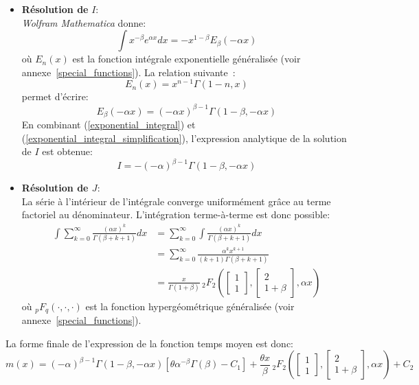 \begin{itemize}
    \item \textbf{Résolution de} $I$: \\
    \textit{Wolfram Mathematica} donne:
    \begin{equation}\label{exponential_integral}
        \int x^{-\beta}e^{\alpha x}dx = -x^{1-\beta}E_\beta(-\alpha x)
    \end{equation}
    où $E_n(x)$ est la fonction intégrale exponentielle généralisée (voir annexe~\ref{special_functions}).
    La relation suivante~\cite{abramowitz1964}:
    \[
    E_n(x)=x^{n-1}\Gamma(1-n,x)
    \]
    permet d'écrire: 
    \begin{equation}\label{exponential_integral_simplification}
        E_{\beta}(-\alpha x)={(-\alpha x)}^{\beta-1}\Gamma(1-\beta,-\alpha x)
    \end{equation}
    En combinant (\ref{exponential_integral}) et (\ref{exponential_integral_simplification}), l'expression analytique de la solution de $I$ est obtenue:
    \[
        I=-{(-\alpha)}^{\beta-1}\Gamma(1-\beta,-\alpha x)
    \]
    \item \textbf{Résolution de $J$}: \\
    La série à l'intérieur de l'intégrale converge uniformément grâce au terme factoriel au dénominateur. L'intégration terme-à-terme est donc possible: 
    \[
    \begin{aligned}
        \int\sum_{k=0}^{\infty} \frac{{(\alpha x)}^k}{\Gamma(\beta+k+1)}dx &= \sum_{k=0}^{\infty} \int \frac{{(\alpha x)}^k}{\Gamma(\beta+k+1)}dx \\
        &= \sum_{k=0}^{\infty} \frac{\alpha^k x^{k+1}}{(k+1)\Gamma(\beta+k+1)} \\
        &= \frac{x}{\Gamma(1+\beta)}\,_2F_2\left(\begin{bmatrix}1\\1\end{bmatrix},\begin{bmatrix}2\\1+\beta\end{bmatrix},\alpha x\right)
    \end{aligned}
    \]
    où $_p F_q(\cdot,\cdot,\cdot)$ est la fonction hypergéométrique généralisée (voir annexe~\ref{special_functions}).
    
\end{itemize}
La forme finale de l'expression de la fonction temps moyen est donc:
\begin{equation}\label{sol_mean}
    m(x)={(-\alpha)}^{\beta-1}\Gamma(1-\beta,-\alpha x)\left[\theta\alpha^{-\beta}\Gamma(\beta)-C_1\right]+\frac{\theta x}{\beta}\,{}_2F_2\left(\begin{bmatrix}1\\1\end{bmatrix},\begin{bmatrix}2\\1+\beta\end{bmatrix},\alpha x\right) + C_2
\end{equation}

